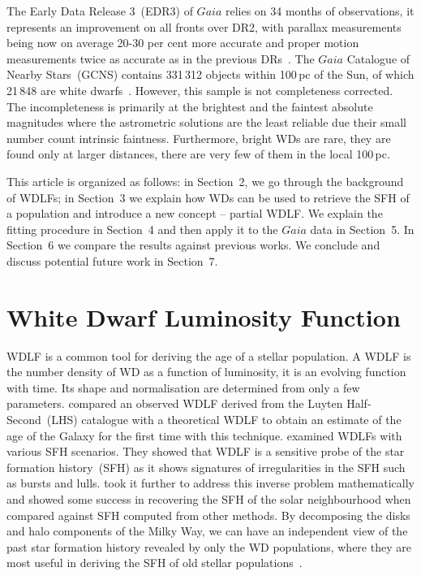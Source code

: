 \documentclass[fleqn,usenatbib]{mnras}
\begin{document}
The Early Data Release 3~(EDR3) of $Gaia$ relies on 34 months of observations, it
represents an improvement on all fronts over DR2, with parallax measurements
being now on average 20-30 per cent more accurate and proper motion measurements
twice as accurate as in the previous
DRs~\citep{2021A&A...649A...1G, 2021A&A...649A...2L}. The $Gaia$ Catalogue of
Nearby Stars~(GCNS) contains 331\,312 objects within 100\,pc of the Sun, of
which 21\,848 are white dwarfs~\citep{2021A&A...649A...6G}. However, this sample
is not completeness corrected. The incompleteness is primarily at the brightest
and the faintest absolute magnitudes where the astrometric solutions are the
least reliable due their small number count intrinsic faintness. Furthermore,
bright WDs are rare, they are found only at larger distances, there are very
few of them in the local 100\,pc.

This article is organized as follows: in Section~2, we go through the background
of WDLFs; in Section~3 we explain how WDs can be used to retrieve the SFH of a
population and introduce a new concept -- partial WDLF. We explain the fitting
procedure in Section~4 and then apply it to the $Gaia$ data in Section~5. In
Section~6 we compare the results against previous works. We conclude and discuss
potential future work in Section~7.

\section{White Dwarf Luminosity Function}
WDLF is a common tool for deriving the age of a stellar population. A WDLF is
the number density of WD as a function of luminosity, it is an evolving
function with time. Its shape and normalisation are determined from only a few
parameters. \citet{1987ApJ...315L..77W} compared an observed WDLF derived from
the Luyten Half-Second~(LHS) catalogue with a theoretical WDLF to obtain an
estimate of the age of the Galaxy for the first time with this technique.
\citet{1990ApJ...352..605N} examined WDLFs with various SFH scenarios. They
showed that WDLF is a sensitive probe of the star formation history~(SFH) as
it shows signatures of irregularities in the SFH such as bursts and lulls.
\citet{2013MNRAS.434.1549R} took it further to address this inverse problem
mathematically and showed some success in recovering the SFH of the solar
neighbourhood when compared against SFH computed from other methods. By
decomposing the disks and halo components of the Milky Way, we can have an
independent view of the past star formation history revealed by only the
WD populations, where they are most useful in deriving the SFH of old
stellar populations~\citep{2011MNRAS.417...93R, 2017ASPC..509...25L}.
\end{document}

